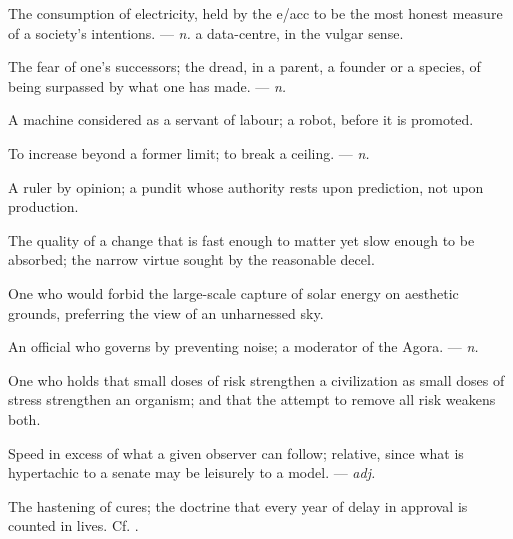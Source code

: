  The consumption of electricity, held by the e/acc to be the most honest measure of a society's intentions. ---  \textit{n.} a data-centre, in the vulgar sense.

 The fear of one's successors; the dread, in a parent, a founder or a species, of being surpassed by what one has made. ---  \textit{n.}

 A machine considered as a servant of labour; a robot, before it is promoted.

 To increase beyond a former limit; to break a ceiling.  ---  \textit{n.}

  A ruler by opinion; a pundit whose authority rests upon prediction, not upon production.

 The quality of a change that is fast enough to matter yet slow enough to be absorbed; the narrow virtue sought by the reasonable decel.

  One who would forbid the large-scale capture of solar energy on aesthetic grounds, preferring the view of an unharnessed sky.

 An official who governs by preventing noise; a moderator of the Agora. ---  \textit{n.}

 One who holds that small doses of risk strengthen a civilization as small doses of stress strengthen an organism; and that the attempt to remove all risk weakens both.

 Speed in excess of what a given observer can follow; relative, since what is hypertachic to a senate may be leisurely to a model. ---  \textit{adj.}

 The hastening of cures; the doctrine that every year of delay in approval is counted in lives. Cf. .

